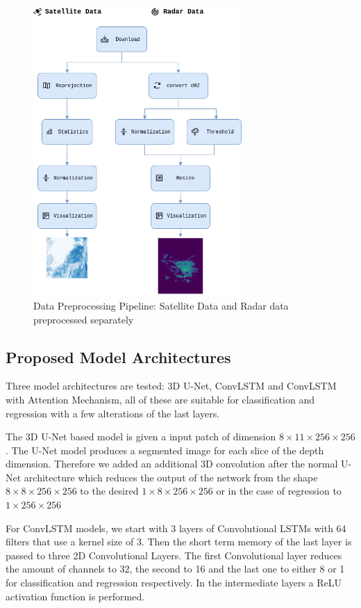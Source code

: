 \begin{figure}
  \centering
  \includegraphics[width=225pt]{./images/prepro.png}
  \caption{Data Preprocessing Pipeline: Satellite Data and Radar data preprocessed separately}
  \label{fig:preprocessing}
\end{figure}

\subsection{Proposed Model Architectures}
Three model architectures are tested: 3D U-Net, ConvLSTM and ConvLSTM with Attention Mechanism, all of these are suitable for classification and regression with a few alterations of the last layers.

The 3D U-Net based model is given a input patch of dimension $8\times11\times256\times256$. The U-Net model produces a segmented image for each slice of the depth dimension.
Therefore we added an additional 3D convolution after the normal U-Net architecture which reduces the output of the network from the shape $8\times8\times256\times256$ to the desired $1\times8\times256\times256$ or in the case of regression to $1\times256\times256$
\smallskip


For ConvLSTM models, we start with 3 layers of Convolutional LSTMs
with 64 filters that use a kernel size of 3.
Then the short term memory of the last layer is passed to three 2D Convolutional Layers.
The first Convolutional layer reduces the amount of channels to 32, the second to 16 and the last one to either 8 or 1 for classification and regression respectively.
In the intermediate layers a ReLU \cite{relu} activation function is performed.
\smallskip

